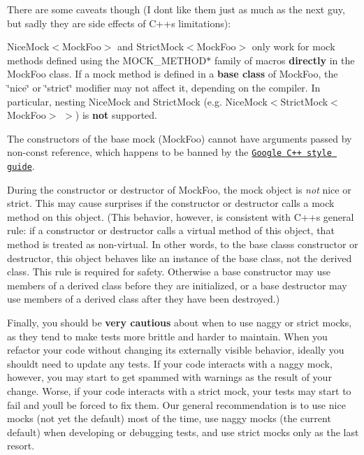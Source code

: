 There are some caveats though (I don\textquotesingle{}t like them just as much as the next guy, but sadly they are side effects of C++\textquotesingle{}s limitations)\+:


\begin{DoxyEnumerate}
\item {\ttfamily Nice\+Mock$<$Mock\+Foo$>$} and {\ttfamily Strict\+Mock$<$Mock\+Foo$>$} only work for mock methods defined using the {\ttfamily M\+O\+C\+K\+\_\+\+M\+E\+T\+H\+O\+D$\ast$} family of macros {\bfseries directly} in the {\ttfamily Mock\+Foo} class. If a mock method is defined in a {\bfseries base class} of {\ttfamily Mock\+Foo}, the \char`\"{}nice\char`\"{} or \char`\"{}strict\char`\"{} modifier may not affect it, depending on the compiler. In particular, nesting {\ttfamily Nice\+Mock} and {\ttfamily Strict\+Mock} (e.\+g. {\ttfamily Nice\+Mock$<$Strict\+Mock$<$Mock\+Foo$>$ $>$}) is {\bfseries not} supported.
\end{DoxyEnumerate}
\begin{DoxyEnumerate}
\item The constructors of the base mock ({\ttfamily Mock\+Foo}) cannot have arguments passed by non-\/const reference, which happens to be banned by the \href{https://google.github.io/styleguide/cppguide.html}{\tt Google C++ style guide}.
\end{DoxyEnumerate}
\begin{DoxyEnumerate}
\item During the constructor or destructor of {\ttfamily Mock\+Foo}, the mock object is {\itshape not} nice or strict. This may cause surprises if the constructor or destructor calls a mock method on {\ttfamily this} object. (This behavior, however, is consistent with C++\textquotesingle{}s general rule\+: if a constructor or destructor calls a virtual method of {\ttfamily this} object, that method is treated as non-\/virtual. In other words, to the base class\textquotesingle{}s constructor or destructor, {\ttfamily this} object behaves like an instance of the base class, not the derived class. This rule is required for safety. Otherwise a base constructor may use members of a derived class before they are initialized, or a base destructor may use members of a derived class after they have been destroyed.)
\end{DoxyEnumerate}

Finally, you should be {\bfseries very cautious} about when to use naggy or strict mocks, as they tend to make tests more brittle and harder to maintain. When you refactor your code without changing its externally visible behavior, ideally you should\textquotesingle{}t need to update any tests. If your code interacts with a naggy mock, however, you may start to get spammed with warnings as the result of your change. Worse, if your code interacts with a strict mock, your tests may start to fail and you\textquotesingle{}ll be forced to fix them. Our general recommendation is to use nice mocks (not yet the default) most of the time, use naggy mocks (the current default) when developing or debugging tests, and use strict mocks only as the last resort.

